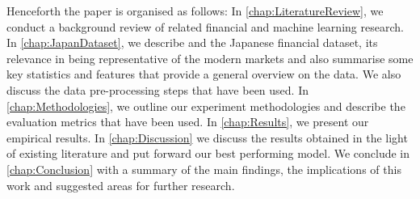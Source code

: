 Henceforth the paper is organised as follows: In \autoref{chap:LiteratureReview}, we conduct a background review of related financial and machine learning research. In \autoref{chap:JapanDataset}, we describe and the Japanese financial dataset, its relevance in being representative of the modern markets and also summarise some key statistics and features that provide a general overview on the data. We also discuss the data pre-processing steps that have been used.
In \autoref{chap:Methodologies}, we outline our experiment methodologies and describe the evaluation metrics that have been used. In \autoref{chap:Results}, we present our empirical results. In \autoref{chap:Discussion} we discuss the results obtained in the light of existing literature and put forward our best performing model. We conclude in \autoref{chap:Conclusion} with a summary of the main findings, the implications of this work and suggested areas for further research.
